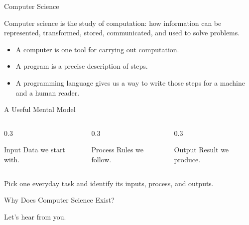 \documentclass[aspectratio=169]{beamer}
\begin{document}
\begin{frame}{Computer Science}
  \begin{cpdefinition}
    Computer science is the study of computation: how information can be represented, transformed, stored, communicated, and used to solve problems.
  \end{cpdefinition}
  \vspace{0.12in}
  \begin{itemize}
    \item A computer is one tool for carrying out computation.
    \item A program is a precise description of steps.
    \item A programming language gives us a way to write those steps for a machine and a human reader.
  \end{itemize}
\end{frame}

\begin{frame}{A Useful Mental Model}
  \begin{columns}[T,onlytextwidth]
    \begin{column}{0.3\textwidth}
      \begin{block}{Input}
        Data we start with.
      \end{block}
    \end{column}
    \begin{column}{0.3\textwidth}
      \begin{block}{Process}
        Rules we follow.
      \end{block}
    \end{column}
    \begin{column}{0.3\textwidth}
      \begin{block}{Output}
        Result we produce.
      \end{block}
    \end{column}
  \end{columns}
  \vspace{0.18in}
  \begin{activity}
    Pick one everyday task and identify its inputs, process, and outputs.
  \end{activity}
\end{frame}


\begin{frame}{Why Does Computer Science Exist?}
  \begin{center}
    {\Huge Let's hear from you.}
  \end{center}
\end{frame}
\end{document}
